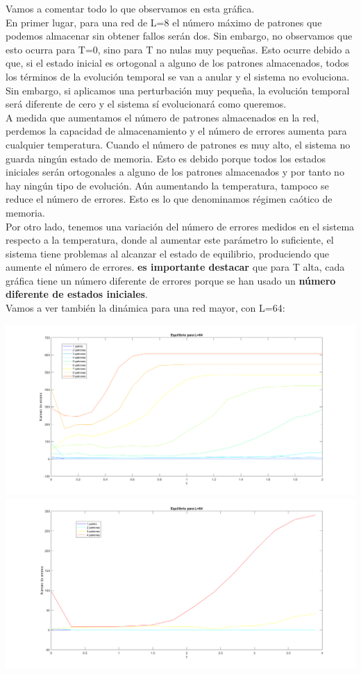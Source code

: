\documentclass[titlepage,12pt]{article}
\numberwithin{equation}{section}
\begin{document}
Vamos a comentar todo lo que observamos en esta gráfica.\\
En primer lugar, para una red de L=8 el número máximo de patrones que podemos almacenar sin obtener fallos serán dos. Sin embargo, no observamos que esto ocurra para T=0, sino para T no nulas muy pequeñas. Esto ocurre debido a que, si el estado inicial es ortogonal a alguno de los patrones almacenados, todos los términos de la evolución temporal se van a anular y el sistema no evoluciona. Sin embargo, si aplicamos una perturbación muy pequeña, la evolución temporal será diferente de cero y el sistema sí evolucionará como queremos.\\
A medida que aumentamos el número de patrones almacenados en la red, perdemos la capacidad de almacenamiento y el número de errores aumenta para cualquier temperatura. Cuando el número de patrones es muy alto, el sistema no guarda ningún estado de memoria. Esto es debido porque todos los estados iniciales serán ortogonales a alguno de los patrones almacenados y por tanto no hay ningún tipo de evolución. Aún aumentando la temperatura, tampoco se reduce el número de errores. Esto es lo que denominamos régimen caótico de memoria.\\
Por otro lado, tenemos una variación del número de errores medidos en el sistema respecto a la temperatura, donde al aumentar este parámetro lo suficiente, el sistema tiene problemas al alcanzar el estado de equilibrio, produciendo que aumente el número de errores. \textbf{es importante destacar} que para T alta, cada gráfica tiene un número diferente de errores porque se han usado un \textbf{número diferente de estados iniciales}.\\
Vamos a ver también la dinámica para una red mayor, con L=64:\\
\begin{center}
     \includegraphics[scale=0.2]{dinamicaL64}
     \includegraphics[scale=0.2]{dinamicaL64Talta}
 \end{center}
\end{document}
